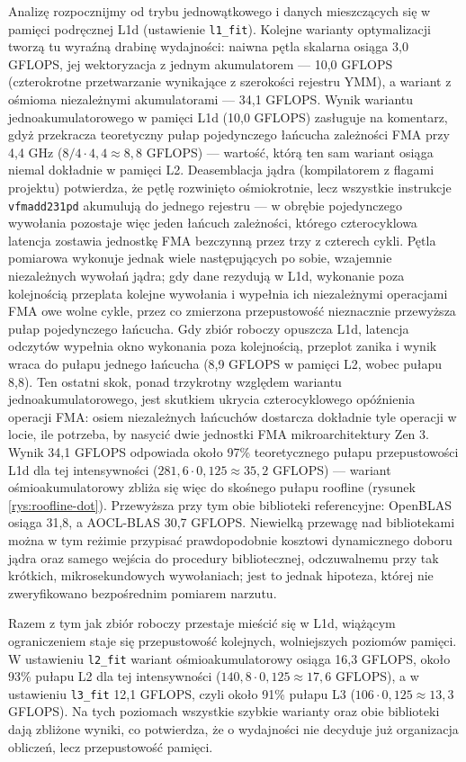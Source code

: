 \documentclass[a4paper,12pt]{book} %
\begin{document}
Analizę rozpocznijmy od trybu jednowątkowego i danych mieszczących się w pamięci podręcznej L1d (ustawienie \texttt{l1\_fit}). Kolejne warianty optymalizacji tworzą tu wyraźną drabinę wydajności: naiwna pętla skalarna osiąga 3,0 GFLOPS, jej wektoryzacja z jednym akumulatorem --- 10,0 GFLOPS (czterokrotne przetwarzanie wynikające z szerokości rejestru YMM), a wariant z ośmioma niezależnymi akumulatorami --- 34,1 GFLOPS. Wynik wariantu jednoakumulatorowego w pamięci L1d (10,0 GFLOPS) zasługuje na komentarz, gdyż przekracza teoretyczny pułap pojedynczego łańcucha zależności FMA przy 4,4 GHz ($8/4 \cdot 4{,}4 \approx 8{,}8$ GFLOPS) --- wartość, którą ten sam wariant osiąga niemal dokładnie w pamięci L2. Deasemblacja jądra (kompilatorem z flagami projektu) potwierdza, że pętlę rozwinięto ośmiokrotnie, lecz wszystkie instrukcje \texttt{vfmadd231pd} akumulują do jednego rejestru --- w obrębie pojedynczego wywołania pozostaje więc jeden łańcuch zależności, którego czterocyklowa latencja zostawia jednostkę FMA bezczynną przez trzy z czterech cykli. Pętla pomiarowa wykonuje jednak wiele następujących po sobie, wzajemnie niezależnych wywołań jądra; gdy dane rezydują w L1d, wykonanie poza kolejnością przeplata kolejne wywołania i wypełnia ich niezależnymi operacjami FMA owe wolne cykle, przez co zmierzona przepustowość nieznacznie przewyższa pułap pojedynczego łańcucha. Gdy zbiór roboczy opuszcza L1d, latencja odczytów wypełnia okno wykonania poza kolejnością, przeplot zanika i wynik wraca do pułapu jednego łańcucha (8,9 GFLOPS w pamięci L2, wobec pułapu 8,8). Ten ostatni skok, ponad trzykrotny względem wariantu jednoakumulatorowego, jest skutkiem ukrycia czterocyklowego opóźnienia operacji FMA: osiem niezależnych łańcuchów dostarcza dokładnie tyle operacji w locie, ile potrzeba, by nasycić dwie jednostki FMA mikroarchitektury Zen 3. Wynik 34,1 GFLOPS odpowiada około 97\% teoretycznego pułapu przepustowości L1d dla tej intensywności ($281{,}6 \cdot 0{,}125 \approx 35{,}2$ GFLOPS) --- wariant ośmioakumulatorowy zbliża się więc do skośnego pułapu roofline (rysunek \ref{rys:roofline-dot}). Przewyższa przy tym obie biblioteki referencyjne: OpenBLAS osiąga 31,8, a AOCL-BLAS 30,7 GFLOPS. Niewielką przewagę nad bibliotekami można w tym reżimie przypisać prawdopodobnie kosztowi dynamicznego doboru jądra oraz samego wejścia do procedury bibliotecznej, odczuwalnemu przy tak krótkich, mikrosekundowych wywołaniach; jest to jednak hipoteza, której nie zweryfikowano bezpośrednim pomiarem narzutu.

Razem z tym jak zbiór roboczy przestaje mieścić się w L1d, wiążącym ograniczeniem staje się przepustowość kolejnych, wolniejszych poziomów pamięci. W ustawieniu \texttt{l2\_fit} wariant ośmioakumulatorowy osiąga 16,3 GFLOPS, około 93\% pułapu L2 dla tej intensywności ($140{,}8 \cdot 0{,}125 \approx 17{,}6$ GFLOPS), a w ustawieniu \texttt{l3\_fit} 12,1 GFLOPS, czyli około 91\% pułapu L3 ($106 \cdot 0{,}125 \approx 13{,}3$ GFLOPS). Na tych poziomach wszystkie szybkie warianty oraz obie biblioteki dają zbliżone wyniki, co potwierdza, że o wydajności nie decyduje już organizacja obliczeń, lecz przepustowość pamięci.
\end{document}
